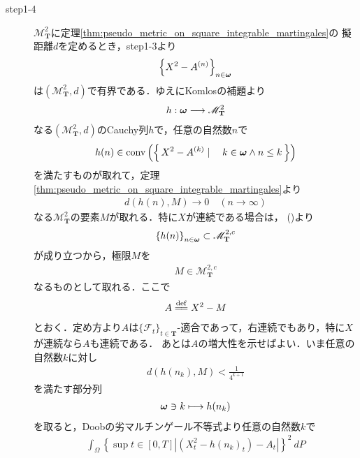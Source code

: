 \begin{sketch}
\begin{description}
			\item[step1-4]
				$\mathscr{M}^2_{\mathbf{T}}$に定理\ref{thm:pseudo_metric_on_square_integrable_martingales}の
				擬距離$d$を定めるとき，step1-3より
				\begin{align}
					\left\{X^2 - A^{(n)}\right\}_{n \in {\boldsymbol \omega}}
				\end{align}
				は$\left(\mathscr{M}^2_{\mathbf{T}},d\right)$で有界である．ゆえにKomlosの補題より
				\begin{align}
					h:{\boldsymbol \omega} \longrightarrow \mathscr{M}^2_{\mathbf{T}}
				\end{align}
				なる$\left(\mathscr{M}^2_{\mathbf{T}},d\right)$のCauchy列$h$で，任意の自然数$n$で
				\begin{align}
					h(n) \in \operatorname*{conv} \left(\left\{\, X^2-A^{(k)} \mid \quad k \in {\boldsymbol \omega} \wedge n \leq k\, \right\}\right)
					\label{fom:thm_decomposition_of_local_martingales_3}
				\end{align}
				を満たすものが取れて，定理\ref{thm:pseudo_metric_on_square_integrable_martingales}より
				\begin{align}
					d(h(n),M) \longrightarrow 0\quad (n \longrightarrow \infty)
				\end{align}
				なる$\mathscr{M}^2_{\mathbf{T}}$の要素$M$が取れる．特に$X$が連続である場合は，
				()より
				\begin{align}
					\left\{h(n)\right\}_{n \in {\boldsymbol \omega}} \subset \mathscr{M}^{2,c}_{\mathbf{T}}
				\end{align}
				が成り立つから，極限$M$を
				\begin{align}
					M \in \mathscr{M}^{2,c}_{\mathbf{T}}
				\end{align}
				なるものとして取れる．ここで
				\begin{align}
					A \defeq X^2 - M
				\end{align}
				とおく．定め方より$A$は$\{\mathscr{F}_t\}_{t \in \mathbf{T}}$-適合であって，右連続でもあり，特に$X$が連続なら$A$も連続である．
				あとは$A$の増大性を示せばよい．いま任意の自然数$k$に対し
				\begin{align}
					d(h(n_k),M) < \frac{1}{4^{k+1}}
				\end{align}
				を満たす部分列
				\begin{align}
					{\boldsymbol \omega} \ni k \longmapsto h(n_k)
				\end{align}
				を取ると，Doobの劣マルチンゲール不等式より任意の自然数$k$で
				\begin{align}
					\int_\Omega \left\{\sup{t \in [0,T]}{\left|\left(X^2_t - h(n_k)_t\right) - A_t\right|}\right\}^2\ dP

\end{align}
\end{description}
\end{sketch}
